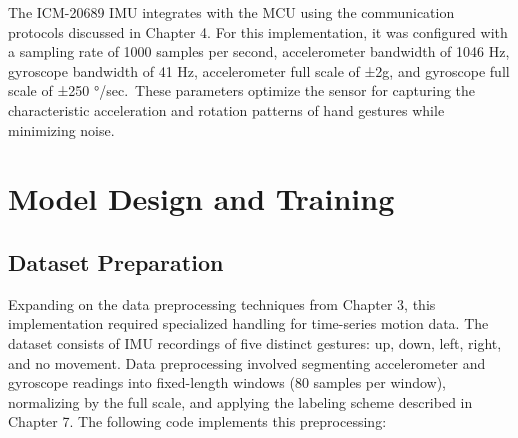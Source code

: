\documentclass[
  9pt,
  letterpaper,
  abstract,
  titlepage]{scrbook}
\begin{document}
The ICM-20689 IMU integrates with the MCU using the communication
protocols discussed in Chapter 4. For this implementation, it was
configured with a sampling rate of 1000 samples per second,
accelerometer bandwidth of 1046 Hz, gyroscope bandwidth of 41 Hz,
accelerometer full scale of ±2g, and gyroscope full scale of ±250
°/sec.~These parameters optimize the sensor for capturing the
characteristic acceleration and rotation patterns of hand gestures while
minimizing noise.

\section{Model Design and Training}\label{model-design-and-training-1}

\subsection{Dataset Preparation}\label{dataset-preparation-1}

Expanding on the data preprocessing techniques from Chapter 3, this
implementation required specialized handling for time-series motion
data. The dataset consists of IMU recordings of five distinct gestures:
up, down, left, right, and no movement. Data preprocessing involved
segmenting accelerometer and gyroscope readings into fixed-length
windows (80 samples per window), normalizing by the full scale, and
applying the labeling scheme described in Chapter 7. The following code
implements this preprocessing:
\end{document}
